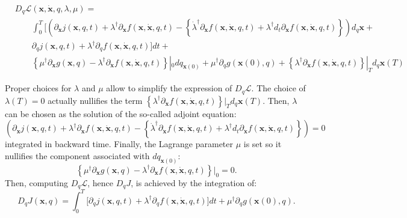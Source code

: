 \documentclass[aip,pof,nofootinbib,reprint,onecolumn]{revtex4-1}
\newcommand{\gras}[1]{\boldsymbol{#1}}
\newcommand{\mypar}[1]{\left(#1\right)}
\newcommand{\mya}[1]{\left\{#1\right\}}
\newcommand{\fdyn}{f} %
\newcommand{\costf}{J} %
\newcommand{\costff}{j} %
\newcommand{\lag}{\mathcal{L}} %
\newcommand{\point}{\gras{x}} %
\begin{document}
\begin{equation}
\begin{split}
&D_q\lag\mypar{\point,\dot{\point},q,\lambda,\mu} = \\
& \qquad \int_0^T  \bigg[  \mypar{\partial_{\point}\costff(\point,q,t) + \lambda^{\dagger} \partial_{\point}  \fdyn(\point,\dot{\point},q,t) - \mya{\dot{\lambda}^{\dagger}\partial_{\dot{\point}} \fdyn(\point,\dot{\point},q,t) + \lambda^{\dagger}d_t\partial_{\dot{\point}}\fdyn(\point,\dot{\point},q,t)}} d_q \point   +\\
& \qquad \partial_{q} \costff(\point,q,t)    + \lambda^{\dagger}\partial_q\fdyn(\point,\dot{\point},q,t) \bigg] dt + \\
& \qquad \mya{\mu^{\dagger} \partial_{\point} g(\point,q) - \lambda^{\dagger}\partial_{\dot{\point}} \fdyn(\point,\dot{\point},q,t) }|_0 dq_{\point(0)}  + \mu^{\dagger} \partial_q g(\point(0),q) + \mya{\lambda^{\dagger}\partial_{\dot{\point}} \fdyn(\point,\dot{\point},q,t)}|_T d_q \point(T)
\end{split}
\label{eq-deriv_ord}
\end{equation}

Proper choices for $\lambda$ and $\mu$ allow to simplify the expression of $D_q\lag$.
The choice of $\lambda\mypar{T} = 0$ actually nullifies the term $\mya{\lambda^{\dagger}\partial_{\dot{\point}} \fdyn(\point,\dot{\point},q,t)}|_T d_q \point(T)$.
Then, $\lambda$ can be chosen as the solution of the so-called adjoint equation:
$$
\mypar{\partial_{\point}\costff(\point,q,t) + \lambda^{\dagger} \partial_{\point}  \fdyn(\point,\dot{\point},q,t) - \mya{\dot{\lambda}^{\dagger}\partial_{\dot{\point}} \fdyn(\point,\dot{\point},q,t) + \lambda^{\dagger}d_t\partial_{\dot{\point}}\fdyn(\point,\dot{\point},q,t)}} = 0 
$$
integrated in backward time. 
Finally, the Lagrange parameter $\mu$ is set so it nullifies the component associated with $dq_{\point(0)}$:
$$ \mya{\mu^{\dagger} \partial_{\point} g(\point,q) - \lambda^{\dagger}\partial_{\dot{\point}} \fdyn(\point,\dot{\point},q,t) }|_0 = 0.$$
Then, computing $D_q\lag$, hence $ D_q\costf$, is achieved by the integration of:
\begin{equation}
D_q\costf\mypar{\point,q} = \int_0^T  \bigg[  \partial_{q} \costff(\point,q,t)    + \lambda^{\dagger}\partial_q\fdyn(\point,\dot{\point},q,t) \bigg] dt +   \mu^{\dagger} \partial_q g(\point(0),q).
\label{eq-J_adj}
\end{equation}




%
\end{document}
